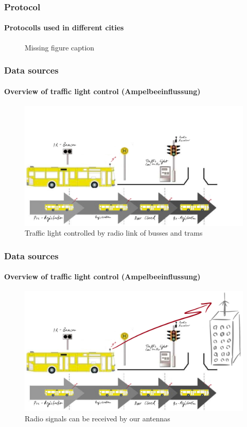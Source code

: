 
\begin{frame}
\frametitle{Protocol}
\framesubtitle{Protocolls used in different cities}
\begin{figure}
\centering
\missingfigure[figwidth=7cm]{}
\caption{Missing figure caption}
\end{figure}
\end{frame}


\begin{frame}
\frametitle{Data sources}
\framesubtitle{Overview of traffic light control (Ampelbeeinflussung)}
\begin{figure}
\centering
\includegraphics[height=0.65\textheight]{figs/lsa-beeinflussungs-stecke.pdf}
\caption{Traffic light controlled by radio link of busses and trams}
\end{figure}
\end{frame}


\begin{frame}
\frametitle{Data sources}
\framesubtitle{Overview of traffic light control (Ampelbeeinflussung)}
\begin{figure}
\centering
\includegraphics[height=0.65\textheight]{figs/lsa-beeinflussungs-stecke-mit-antenne.pdf}
\caption{Radio signals can be received by our antennas}
\end{figure}
\end{frame}

